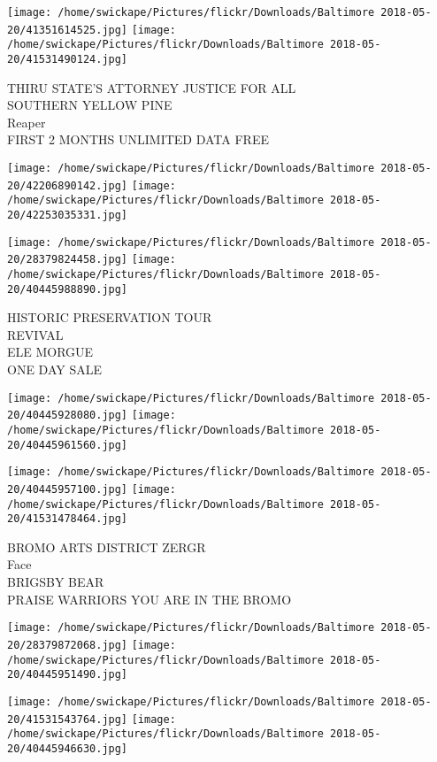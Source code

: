 \documentclass[10pt,letterpaper]{article}
\begin{document}
\texttt{[image: /home/swickape/Pictures/flickr/Downloads/Baltimore 2018-05-20/41351614525.jpg]}
\texttt{[image: /home/swickape/Pictures/flickr/Downloads/Baltimore 2018-05-20/41531490124.jpg]}

THIRU STATE'S ATTORNEY JUSTICE FOR ALL\\
SOUTHERN YELLOW PINE\\
Reaper\\
FIRST 2 MONTHS UNLIMITED DATA FREE
\pagebreak

\texttt{[image: /home/swickape/Pictures/flickr/Downloads/Baltimore 2018-05-20/42206890142.jpg]}
\texttt{[image: /home/swickape/Pictures/flickr/Downloads/Baltimore 2018-05-20/42253035331.jpg]}

\texttt{[image: /home/swickape/Pictures/flickr/Downloads/Baltimore 2018-05-20/28379824458.jpg]}
\texttt{[image: /home/swickape/Pictures/flickr/Downloads/Baltimore 2018-05-20/40445988890.jpg]}

HISTORIC PRESERVATION TOUR\\
REVIVAL\\
ELE MORGUE\\
ONE DAY SALE
\pagebreak

\texttt{[image: /home/swickape/Pictures/flickr/Downloads/Baltimore 2018-05-20/40445928080.jpg]}
\texttt{[image: /home/swickape/Pictures/flickr/Downloads/Baltimore 2018-05-20/40445961560.jpg]}

\texttt{[image: /home/swickape/Pictures/flickr/Downloads/Baltimore 2018-05-20/40445957100.jpg]}
\texttt{[image: /home/swickape/Pictures/flickr/Downloads/Baltimore 2018-05-20/41531478464.jpg]}

BROMO ARTS DISTRICT ZERGR\\
Face\\
BRIGSBY BEAR\\
PRAISE WARRIORS YOU ARE IN THE BROMO
\pagebreak

\texttt{[image: /home/swickape/Pictures/flickr/Downloads/Baltimore 2018-05-20/28379872068.jpg]}
\texttt{[image: /home/swickape/Pictures/flickr/Downloads/Baltimore 2018-05-20/40445951490.jpg]}

\texttt{[image: /home/swickape/Pictures/flickr/Downloads/Baltimore 2018-05-20/41531543764.jpg]}
\texttt{[image: /home/swickape/Pictures/flickr/Downloads/Baltimore 2018-05-20/40445946630.jpg]}
\end{document}
